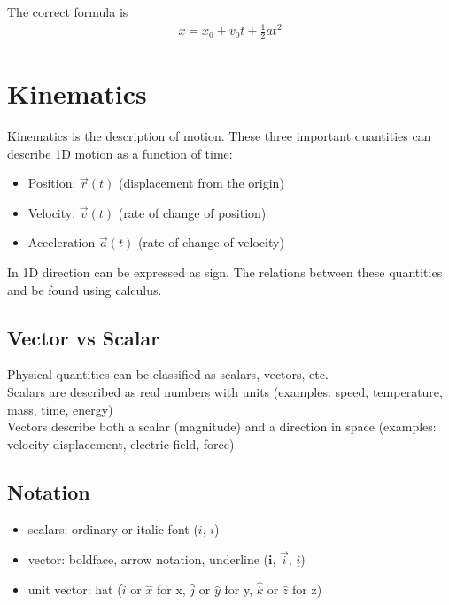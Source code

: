 \documentclass{article}
\theoremstyle{mytheoremstyle}
\theoremstyle{mytheoremstyle}
\theoremstyle{myproblemstyle}
\begin{document}
    The correct formula is
    \begin{align*}
        x = x_0 + v_0 t + \frac{1}{2} a t^2
    \end{align*}

    \section*{Kinematics}
    Kinematics is the description of motion. These three important quantities
    can describe 1D motion as a function of time:
    \begin{itemize}
        \item Position: $\vec{r}(t)$ (displacement from the origin)
        \item Velocity: $\vec{v}(t)$ (rate of change of position)
        \item Acceleration $\vec{a}(t)$ (rate of change of velocity)
    \end{itemize}

    In 1D direction can be expressed as sign. The relations between these
    quantities and be found using calculus.

    \subsection*{Vector vs Scalar}
    Physical quantities can be classified as scalars, vectors, etc. \\
    Scalars are described as real numbers with units (examples: speed,
    temperature, mass, time, energy) \\
    Vectors describe both a scalar (magnitude) and a direction in space
    (examples: velocity displacement, electric field, force)

    \subsection*{Notation}
    \begin{itemize}
        \item scalars: ordinary or italic font ($i$, $\textit{i}$)

        \item vector: boldface, arrow notation, underline ($\textbf{i}$, $\vec{i}$, $\underline{i}$)

        \item unit vector: hat ($\hat{i}$ or $\hat{x}$ for x, $\hat{j}$ or
            $\hat{y}$ for y, $\hat{k}$ or $\hat{z}$ for z)
    \end{itemize}
\end{document}
